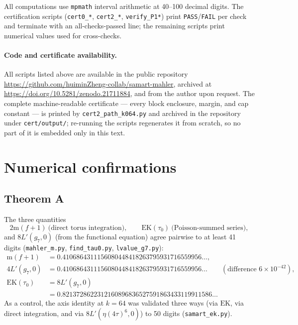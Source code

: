 \documentclass[11pt]{article}
\theoremstyle{definition}
\theoremstyle{remark}
\newcommand{\m}{\mathrm{m}}
\begin{document}
All computations use \texttt{mpmath} interval arithmetic at 40--100 decimal
digits. The certification scripts (\texttt{cert0\_*}, \texttt{cert2\_*},
\texttt{verify\_P1*}) print \texttt{PASS}/\texttt{FAIL} per check and
terminate with an all-checks-passed line; the remaining scripts print
numerical values used for cross-checks.

\paragraph{Code and certificate availability.}
All scripts listed above are available in the public repository
\url{https://github.com/huiminZheng-collab/samart-mahler}, archived at
\url{https://doi.org/10.5281/zenodo.21711884}, and from the author
upon request. The complete machine-readable certificate --- every block
enclosure, margin, and cap constant --- is printed by
\texttt{cert2\_path\_k064.py} and archived in the repository under
\texttt{cert/output/}; re-running the scripts regenerates it from
scratch, so no part of it is embedded only in this text.

\section{Numerical confirmations}\label{sec:numerics}

\subsection{Theorem A}

The three quantities
\[
  2\m(f+1)\ \text{(direct torus integration)},\qquad
  \mathrm{EK}(\tau_0)\ \text{(Poisson-summed series)},
\]
and $8L'(g_7,0)$ (from the functional equation)
agree pairwise to at least 41 digits (\texttt{mahler\_m.py},
\texttt{find\_tau0.py}, \texttt{lvalue\_g7.py}):
\begin{align*}
  \m(f+1)&=0.4106864311156080448418263795931716559956\ldots,\\
  4L'(g_7,0)&=0.4106864311156080448418263795931716559956\ldots
   \qquad(\text{difference }6\times10^{-42}),\\
  \mathrm{EK}(\tau_0)&=8L'(g_7,0)\\
  &=0.8213728622312160896836527591863433119911586\ldots
\end{align*}
As a control, the axis identity at $k=64$ was validated three ways (via
$\mathrm{EK}$, via direct integration, and via $8L'(\eta(4\tau)^6,0)$) to
50 digits (\texttt{samart\_ek.py}).
\end{document}
